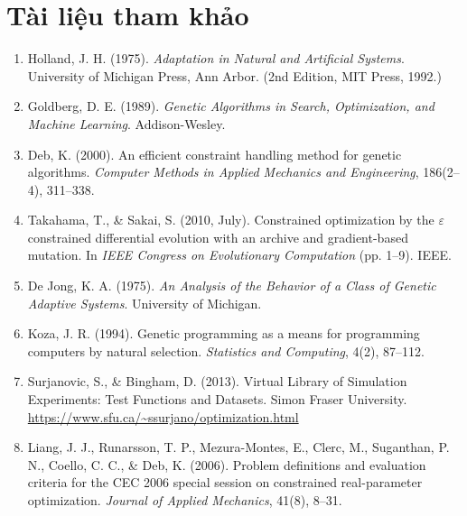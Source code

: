 %
\chapter*{Tài liệu tham khảo}

\begin{enumerate}

\item Holland, J. H. (1975). \textit{Adaptation in Natural and Artificial Systems}. University of Michigan Press, Ann Arbor. (2nd Edition, MIT Press, 1992.)

\item Goldberg, D. E. (1989). \textit{Genetic Algorithms in Search, Optimization, and Machine Learning}. Addison-Wesley.

\item Deb, K. (2000). An efficient constraint handling method for genetic algorithms. \textit{Computer Methods in Applied Mechanics and Engineering}, 186(2--4), 311--338.

\item Takahama, T., \& Sakai, S. (2010, July). Constrained optimization by the $\varepsilon$ constrained differential evolution with an archive and gradient-based mutation. In \textit{IEEE Congress on Evolutionary Computation} (pp. 1--9). IEEE.

\item De Jong, K. A. (1975). \textit{An Analysis of the Behavior of a Class of Genetic Adaptive Systems}. University of Michigan.

\item Koza, J. R. (1994). Genetic programming as a means for programming computers by natural selection. \textit{Statistics and Computing}, 4(2), 87--112.

\item Surjanovic, S., \& Bingham, D. (2013). Virtual Library of Simulation Experiments: Test Functions and Datasets. Simon Fraser University. \url{https://www.sfu.ca/~ssurjano/optimization.html}

\item Liang, J. J., Runarsson, T. P., Mezura-Montes, E., Clerc, M., Suganthan, P. N., Coello, C. C., \& Deb, K. (2006). Problem definitions and evaluation criteria for the CEC 2006 special session on constrained real-parameter optimization. \textit{Journal of Applied Mechanics}, 41(8), 8--31.


\end{enumerate}
